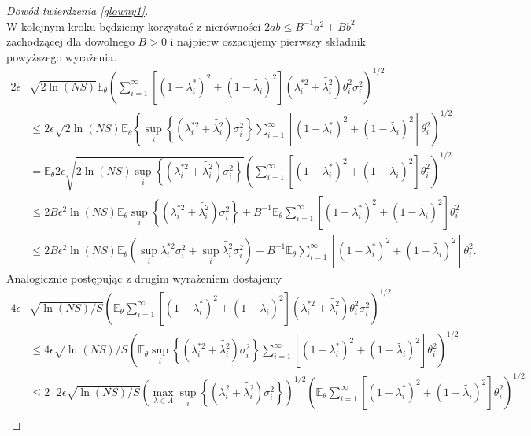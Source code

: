 \documentclass[man,mfiu]{mgrwms}
\begin{document}
\begin{proof}[Dowód twierdzenia \ref{glowny1}]
\begin{displaymath}
\end{displaymath}
W kolejnym kroku będziemy korzystać z nierówności $2ab\leq B^{-1}a^2+Bb^2$ zachodzącej dla dowolnego $B>0$ i najpierw oszacujemy pierwszy składnik powyższego wyrażenia.
\begin{displaymath}
\begin{split}
2\epsilon&\sqrt{2\ln (NS)}\mathbb{E}_{\theta}\left(\sum_{i=1}^{\infty}[(1-\lambda_i^*)^2+(1-\tilde{\lambda_i})^2](\lambda_i^{*2}+\tilde{\lambda_i^2})\theta_i^2\sigma_i^2\right)^{1/2}\\
&\leq 2\epsilon\sqrt{2\ln (NS)}\mathbb{E}_{\theta}\left\{\sup_i\left\{(\lambda_i^{*2}+\tilde{\lambda_i^2})\sigma_i^2\right\} \sum_{i=1}^{\infty}[(1-\lambda_i^*)^2+(1-\tilde{\lambda_i})^2]\theta_i^2\right)^{1/2}\\
&=\mathbb{E}_{\theta}2\epsilon\sqrt{2\ln (NS)\sup_i\left\{(\lambda_i^{*2}+\tilde{\lambda_i^2})\sigma_i^2\right\}}\left(\sum_{i=1}^{\infty}[(1-\lambda_i^*)^2+(1-\tilde{\lambda_i})^2]\theta_i^2\right)^{1/2}\\
&\leq 2B\epsilon^2 \ln (NS)\mathbb{E}_{\theta}\sup_i\left\{(\lambda_i^{*2}+\tilde{\lambda_i^2})\sigma_i^2\right\}+B^{-1}\mathbb{E}_{\theta}\sum_{i=1}^{\infty}[(1-\lambda_i^*)^2+(1-\tilde{\lambda_i})^2]\theta_i^2\\
&\leq 2B\epsilon^2 \ln (NS)\mathbb{E}_{\theta}\left(\sup_i\lambda_i^{*2}\sigma_i^2+\sup_i\tilde{\lambda_i^2}\sigma_i^2\right)+B^{-1}\mathbb{E}_{\theta}\sum_{i=1}^{\infty}[(1-\lambda_i^*)^2+(1-\tilde{\lambda_i})^2]\theta_i^2.
\end{split}
\end{displaymath}
Analogicznie postępując z drugim wyrażeniem dostajemy
\begin{displaymath}
\begin{split}
4\epsilon&\sqrt{\ln (NS)/S}\left(\mathbb{E}_{\theta}\sum_{i=1}^{\infty}[(1-\lambda_i^*)^2+(1-\tilde{\lambda_i})^2](\lambda_i^{*2}+\tilde{\lambda_i^2})\theta_i^2\sigma_i^2\right)^{1/2}\\
&\leq 4\epsilon\sqrt{\ln (NS)/S}\left(\mathbb{E}_{\theta}\sup_i\left\{(\lambda_i^{*2}+\tilde{\lambda_i^2})\sigma_i^2\right\}\sum_{i=1}^{\infty}[(1-\lambda_i^*)^2+(1-\tilde{\lambda_i})^2]\theta_i^2\right)^{1/2}\\
&\leq 2\cdot 2\epsilon\sqrt{\ln (NS)/S} \left(\max_{\lambda\in \Lambda}\sup_i\left\{(\lambda_i^{2}+\tilde{\lambda_i^2})\sigma_i^2\right\}\right)^{1/2}\left(\mathbb{E}_{\theta}\sum_{i=1}^{\infty}[(1-\lambda_i^*)^2+(1-\tilde{\lambda_i})^2]\theta_i^2\right)^{1/2}\\

\end{split}
\end{displaymath}
\end{proof}
\end{document}
